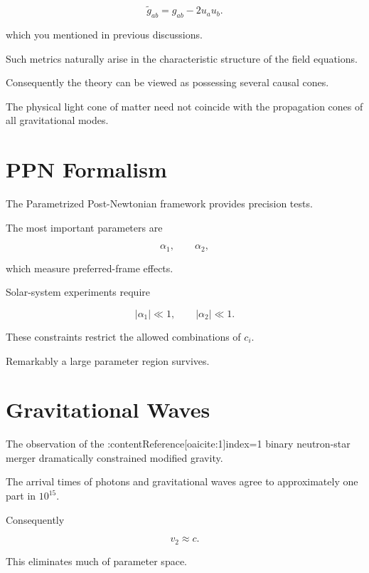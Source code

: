 \documentclass[11pt,a4paper]{article}
\begin{document}
\begin{equation}
\tilde g_{ab}
=
g_{ab}
-
2u_a u_b .
\end{equation}

which you mentioned in previous discussions.

Such metrics naturally arise in the characteristic structure of the
field equations.

Consequently the theory can be viewed as possessing several causal cones.

The physical light cone of matter need not coincide with
the propagation cones of all gravitational modes.

\section{PPN Formalism}

The Parametrized Post-Newtonian framework provides precision tests.

The most important parameters are

\begin{equation}
\alpha_1,
\qquad
\alpha_2,
\end{equation}

which measure preferred-frame effects.

Solar-system experiments require

\begin{equation}
|\alpha_1|
\ll 1,
\qquad
|\alpha_2|
\ll 1.
\end{equation}

These constraints restrict the allowed combinations of
$c_i$.

Remarkably a large parameter region survives.

\section{Gravitational Waves}

The observation of the
:contentReference[oaicite:1]{index=1}
binary neutron-star merger dramatically constrained modified gravity.

The arrival times of photons and gravitational waves agree to
approximately one part in $10^{15}$.

Consequently

\begin{equation}
v_2 \approx c.
\end{equation}

This eliminates much of parameter space.
\end{document}
